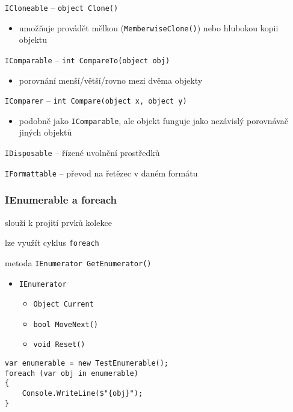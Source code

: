 \begin{frame}[fragile]
\vfill
\begin{bitemize}{}
\item \lstinline|ICloneable| -- \lstinline|object Clone()|
\begin{itemize}
\item umožňuje provádět mělkou (\lstinline|MemberwiseClone()|) nebo hlubokou kopii objektu
\end{itemize}

\item \lstinline|IComparable| -- \lstinline|int CompareTo(object obj)|
\begin{itemize}
\item porovnání menší/větší/rovno mezi dvěma objekty
\end{itemize}

\item \lstinline|IComparer| -- \lstinline|int Compare(object x, object y)|
\begin{itemize}
\item podobně jako \lstinline|IComparable|, ale objekt funguje jako nezávislý porovnávač jiných objektů
\end{itemize}

\item \lstinline|IDisposable| -- řízené uvolnění prostředků
\item \lstinline|IFormattable| -- převod na řetězec v daném formátu
\end{bitemize}
\vfill
\end{frame}




\begin{frame}[fragile]
\frametitle{IEnumerable a foreach}
\vfill
\begin{bitemize}{}
\item slouží k projití prvků kolekce
\item lze využít cyklus \lstinline|foreach|
\item metoda \lstinline|IEnumerator GetEnumerator()|
\begin{itemize}
\item \lstinline|IEnumerator|
\begin{itemize}
\item \lstinline|Object Current|
\item \lstinline|bool MoveNext()|
\item \lstinline|void Reset()|
\end{itemize}
\end{itemize}
\end{bitemize}
\vfill
\begin{yesblock}
\begin{lstlisting}
var enumerable = new TestEnumerable();
foreach (var obj in enumerable)
{
    Console.WriteLine($"{obj}");
}
\end{lstlisting}
\end{yesblock}
\vfill
\end{frame}




